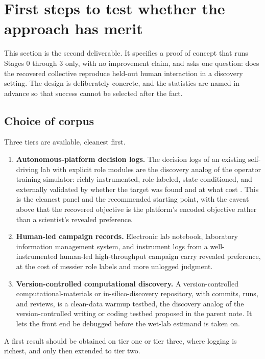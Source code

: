\documentclass[11pt]{article}
\theoremstyle{definition}
\begin{document}
\section{First steps to test whether the approach has merit}

This section is the second deliverable. It specifies a proof of concept that runs Stages 0 through 3 only, with no improvement claim, and asks one question: does the recovered collective reproduce held-out human interaction in a discovery setting. The design is deliberately concrete, and the statistics are named in advance so that success cannot be selected after the fact.

\subsection{Choice of corpus}

Three tiers are available, cleanest first.

\begin{enumerate}[leftmargin=1.7em,itemsep=2pt,topsep=2pt]
  \item \textbf{Autonomous-platform decision logs.} The decision logs of an existing self-driving lab with explicit role modules are the discovery analog of the operator training simulator: richly instrumented, role-labeled, state-conditioned, and externally validated by whether the target was found and at what cost \citep{burger2020, szymanski2023, song2025}. This is the cleanest panel and the recommended starting point, with the caveat above that the recovered objective is the platform's encoded objective rather than a scientist's revealed preference.
  \item \textbf{Human-led campaign records.} Electronic lab notebook, laboratory information management system, and instrument logs from a well-instrumented human-led high-throughput campaign carry revealed preference, at the cost of messier role labels and more unlogged judgment.
  \item \textbf{Version-controlled computational discovery.} A version-controlled computational-materials or in-silico-discovery repository, with commits, runs, and reviews, is a clean-data warmup testbed, the discovery analog of the version-controlled writing or coding testbed proposed in the parent note. It lets the front end be debugged before the wet-lab estimand is taken on.
\end{enumerate}

A first result should be obtained on tier one or tier three, where logging is richest, and only then extended to tier two.
\end{document}
